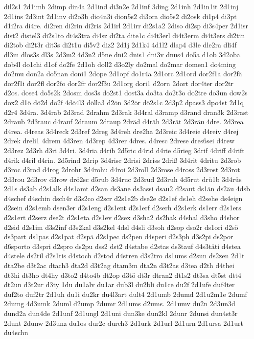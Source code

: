 {dil2s1
2d1imb
2dimp
din4a
2d1ind
di3n2e
2d1inf
3ding
2d1inh
2d1in1it
2d1inj
2d1ins
2d3int
2d1inv
di2o3b
dio4n3i
dion5s2
di3ora
dio5s2
di2osk
di1p4
di3pt
d1i2ra
di4re.
di2ren
di2rin
di2ris
2d1irl
2d1irr
di2s1a2
2diso
di2sp
di3s4per
2d1isr
dist2
distel3
di2s1to
di4s3tra
di4sz
di2ta
dite1c
di4t3erl
di4t3erm
di4t3ers
di2tin
di2tob
di2t3r
dit3s
di2t1u
di5v2
diz2
2d1j
2d1k4
4d1l2
dlap4
d3le
dle2ra
dli4f
dl3m
dlos3s
dl3s
2d3m2
4d3n2
d5ne
dni2
dnis1
dni3v
dnus4
do5a
d1ob
3d2oba
dob4l
do1chi
d1of
do2fe
2d1oh
doll2
d3o2ly
do2mal
do2mar
domen1
do4ming
do2mu
don2a
do5nan
doni1
2dope
2d1opf
do1r4a
2d1orc
2d1ord
dor2f1a
dor2fä
dor2f1i
dor2fl
dor2fo
dor2fr
dor2f3u
2d1org
dori1
d2orn
2dort
dor4ter
dor2tr
d2os.
dose4
do5s2k
2dosm
dos3s
do2st1
dost3a
do3ta
do2t3o
do2tre
do3un
dow2s
dox2
d1ö
dö2d
dö2f
4dö4l3
dölla3
d2ön
3d2ör
dö2s1c
2d3p2
dpass3
dpo4st
2d1q
d2r4
3d4ra.
3d4rab
2d3rad
2drahm
2d3rak
3d4ral
d3ramp
d3rand
dran3k
2d3rast
2draub
2d3rauc
d4rauf
2draum
2draup
2dräd
d4räh
2d3rät
2d3räu
4dre.
2d3rea
d4rea.
d4reas
3d4reck
2d3ref
2dreg
3d4reh
dre2ha
2d3reic
3d4reie
d4reiv
d4rej
2drek
dreli1
4drem
4d3ren
4d3rep
4d3rer
4dres.
d4resc
2drese
dres6sei
d4rew
2d3rez
2d3rh
d3ri
3d4ri.
3d4ria
d4rib
2d5ric
d4rid
d4rie
d5rieg
3drif
4driff
d4rift
d4rik
d4ril
d4rin.
2d5rind
2drip
3d4risc
2drisi
2driss
2driß
3d4rit
4dritu
2d3rob
d3roc
d3rod
d4rog
2drohr
3d4rohu
d4roi
2d3roll
2d3rose
d4ross
2d3rost
2d3rot
2d3rou
2d3rov
d3row
drö2sc
d5rub
3d4ruc
2d3rud
2d3ruh
4d5rut
drü1b
3d4rüs
2d1s
ds3ab
d2s1alk
d4s1amt
d2san
ds3ane
ds3assi
dsau2
d2saut
ds1än
ds2äu
4dsb
d4schef
d4schin
dsch4r
d3s2co
d2scr
d2s1e2b
dse2e
d2s1ef
ds1eh
d2sehe
ds4eign
d2sein
d2s1emb
dsen3er
d2s1eng
d2s1ent
d2s1erf
d2serh
d2s1erk
ds1err
d2s1ers
d2s1ert
d2serz
dse2t
d2s1eta
d2s1ev
d2sex
d3sha2
ds2hak
d4shal
d3sho
d4shor
d2sid
d2s1im
d3s2inf
d3s2kal
d3s2kel
4dsl
d4sli
d3soh
d2sop
dso2r
ds1ori
d2sö
ds3part
ds1pas
d2s1pat
d2spä
d2s1pec
ds2pen
d4speri
d2s3ph
d3s2pi
ds2por
d6sporto
d3spri
d2spro
ds2pu
dss2
dst2
d4stabe
d2stas
ds3tauf
d4s3täti
d4stea
d4stele
ds2til
d2s1tis
d4stoch
d2stod
d4stren
d3s2tro
ds1ums
d2sun
ds2zen
2d1t
dta2be
d3t2ac
dtach3
dta2d
d3t2ag
dtam3m
dta2n
d3t2as
d3tea
d2th
d4thei
dt3hi
dt3ho
dt4hy
d3to2
d4to4b
dt2op
d3tö
dt3r
dtran2
dt1s2
dt3sa
dt5st
dtt4
dt2un
d3t2ur
d3ty
1du
du1alv
du1ar
dub3l
du2bli
du1ce
du2f
2d1ufe
duf4ter
duf2to
duf2tr
2d1uh
du1i
du2kr
du4l3art
dult4
2d1umb
2dumd
2d1u2m1e
2dumf
2dumg
4d3umk
2duml
d2ump
2dumr
2d1ums
d2ums.
2d1umv
du2n
2d3un3d
dund2a
dun4de
2d1unf
2d1ungl
2d1uni
dun3ke
dun2kl
2dunr
2dunsi
dun4st3r
2dunt
2dunw
2d3unz
du1os
dur2c
durch3
2d1urk
2d1url
2d1urn
2d1ursa
2d1urt
du4schn
}
